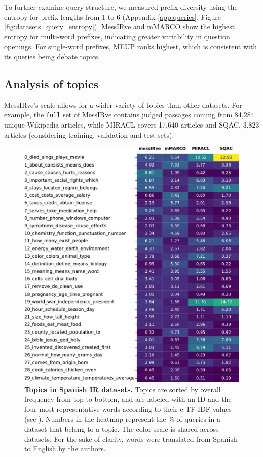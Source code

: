 \documentclass[11pt]{article}
\begin{document}
To further examine query structure, we measured prefix diversity using the entropy for prefix lengths from 1 to 6 (Appendix \ref{app:queries}, Figure \ref{fig:datasets_query_entropy}).
MessIRve and mMARCO show the highest entropy for multi-word prefixes, indicating greater variability in question openings.
For single-word prefixes, MEUP ranks highest, which is consistent with its queries being debate topics.




\subsection{Analysis of topics} \label{sec:topic_analysis}



MessIRve's scale allows for a wider variety of topics than other datasets. For example, the \texttt{full} set of MessIRve contains judged passages coming from 84,284 unique Wikipedia articles, while MIRACL covers 17,640 articles and SQAC, 3,823 articles (considering training, validation and test sets).


\begin{figure}[ht]
  \includegraphics[scale=0.75]{plots/datasets_topics_translated.pdf}
  \centering
  \caption{\textbf{Topics in Spanish IR datasets.} Topics are sorted by overall frequency from top to bottom, and are labeled with an ID and the four most representative words according to their c-TF-IDF values (see \citealp{grootendorst2022bertopic}). Numbers in the heatmap represent the \% of queries in a dataset that belong to a topic. The color scale is shared across datasets. For the sake of clarity, words were translated from Spanish to English by the authors.
  }
  \label{fig:datasets_topics}
\end{figure}
\end{document}
